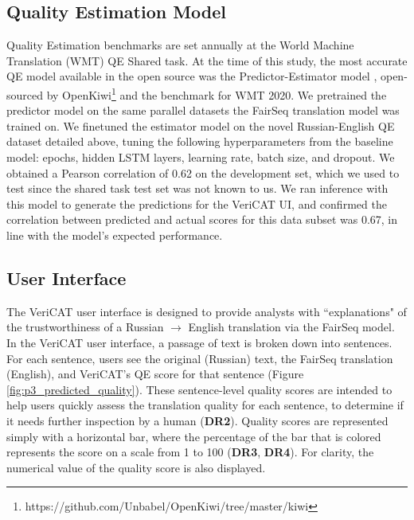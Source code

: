 \subsection{Quality Estimation Model}
Quality Estimation benchmarks are set annually at the World Machine Translation (WMT) QE Shared task. At the time of this study, the most accurate QE model available in the open source was the Predictor-Estimator model \cite{Kim2017PredictorEstimatorUM}, open-sourced by OpenKiwi\footnote{https://github.com/Unbabel/OpenKiwi/tree/master/kiwi} \cite{UnBabel} and the benchmark for WMT 2020. We pretrained the predictor model on the same parallel datasets the FairSeq translation model \cite{ott-etal-2019-fairseq} was trained on. We finetuned the estimator model on the novel Russian-English QE dataset detailed above, tuning the following hyperparameters from the baseline model: epochs, hidden LSTM layers, learning rate, batch size, and dropout. We obtained a Pearson correlation of 0.62 on the development set, which we used to test since the shared task test set was not known to us. We ran inference with this model to generate the predictions for the VeriCAT UI, and confirmed the correlation between predicted and actual scores for this data subset was 0.67, in line with the model's expected performance. 


\subsection{User Interface}

The VeriCAT user interface is designed to provide analysts with ``explanations" of the trustworthiness of a Russian  $\rightarrow$ English translation via the FairSeq model. 
In the VeriCAT user interface, a passage of text is broken down into sentences. For each sentence, users see the original (Russian) text, the FairSeq translation (English), and VeriCAT’s QE score for that sentence (Figure \ref{fig:p3_predicted_quality}). These sentence-level quality scores are intended to help users quickly assess the translation quality for each sentence, to determine if it needs further inspection by a human (\textbf{DR2}). 
Quality scores are represented simply with a horizontal bar, where the percentage of the bar that is colored represents the score on a scale from 1 to 100 (\textbf{DR3}, \textbf{DR4}). For clarity, the numerical value of the quality score is also displayed.  

